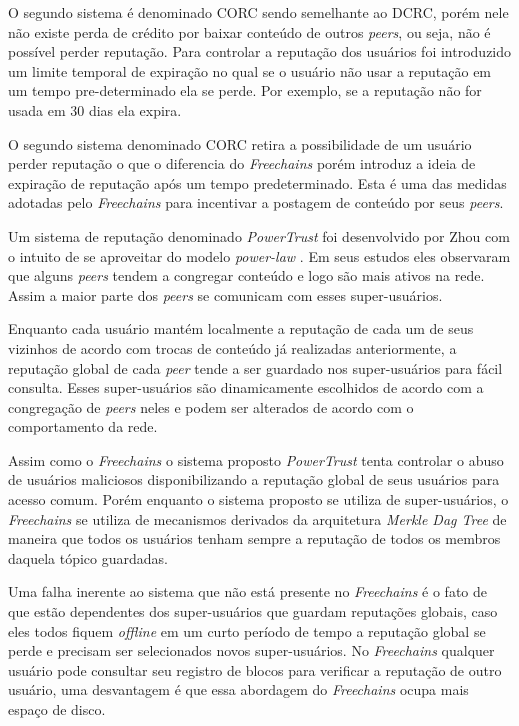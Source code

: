 \documentclass[12pt]{article}
\newcommand{\FC} {\emph{Freechains}\xspace}
\begin{document}
O segundo sistema é denominado CORC sendo semelhante ao DCRC, porém nele não existe perda de crédito por baixar conteúdo de outros \emph{peers}, ou seja, não é possível perder reputação. 
Para controlar a reputação dos usuários foi introduzido um limite temporal de expiração no qual se o usuário não usar a reputação em um tempo pre-determinado ela se perde. 
Por exemplo, se a reputação não for usada em 30 dias ela expira. 

O segundo sistema denominado CORC retira a possibilidade de um usuário perder reputação o que o diferencia do \FC porém introduz a ideia de expiração de reputação após um tempo predeterminado. 
Esta  é uma das medidas adotadas pelo \FC para incentivar a postagem de conteúdo por seus \emph{peers}.

Um sistema de reputação denominado \emph{PowerTrust} foi desenvolvido por Zhou com o intuito de se aproveitar do modelo \emph{power-law} \cite{zhou2007powertrust}. 
Em seus estudos eles observaram que alguns \emph{peers} tendem a congregar conteúdo e logo são mais ativos na rede. 
Assim a maior parte dos \emph{peers} se comunicam com esses super-usuários. 

Enquanto cada usuário mantém localmente a reputação de cada um de seus vizinhos de acordo com trocas de conteúdo já realizadas anteriormente, a reputação global de cada \emph{peer} tende a ser guardado nos super-usuários para fácil consulta. 
Esses super-usuários são dinamicamente escolhidos de acordo com a congregação de \emph{peers} neles e podem ser alterados de acordo com o comportamento da rede.

Assim como o \FC o sistema proposto \emph{PowerTrust} tenta controlar o abuso de usuários maliciosos disponibilizando a reputação global de seus usuários para acesso comum. 
Porém enquanto o sistema proposto se utiliza de super-usuários, o \FC se utiliza de mecanismos derivados da arquitetura \emph{Merkle Dag Tree} de maneira que todos os usuários tenham sempre a reputação de todos os membros daquela tópico guardadas. 

Uma falha inerente ao sistema que não está presente no \FC é o fato de que estão dependentes dos super-usuários que guardam reputações globais, caso eles todos fiquem \emph{offline} em um curto período de tempo a reputação global se perde e precisam ser selecionados novos super-usuários. 
No \FC qualquer usuário pode consultar seu registro de blocos para verificar a reputação de outro usuário, uma desvantagem é que essa abordagem do \FC ocupa mais espaço de disco.
\end{document}
